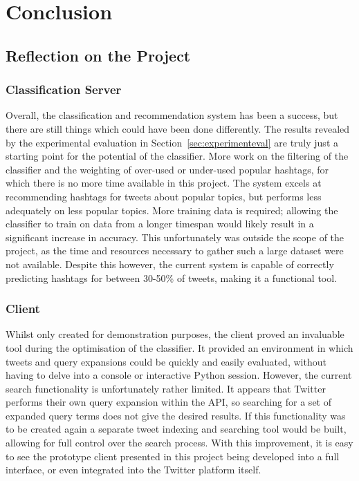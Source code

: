 \documentclass[11pt,a4paper]{report}
\begin{document}
\pagebreak

\chapter{Conclusion}
\label{chap:conclusion}

\section{Reflection on the Project}
\label{sec:reflection}
\subsection{Classification Server}
Overall, the classification and recommendation system has been a success, but there are still things which could have been done differently. The results revealed by the experimental evaluation in Section~\ref{sec:experimenteval} are truly just a starting point for the potential of the classifier. More work on the filtering of the classifier and the weighting of over-used or under-used popular hashtags, for which there is no more time available in this project. The system excels at recommending hashtags for tweets about popular topics, but performs less adequately on less popular topics. More training data is required; allowing the classifier to train on data from a longer timespan would likely result in a significant increase in accuracy. This unfortunately was outside the scope of the project, as the time and resources necessary to gather such a large dataset were not available. Despite this however, the current system is capable of correctly predicting hashtags for between 30-50\% of tweets, making it a functional tool.

\subsection{Client}
Whilst only created for demonstration purposes, the client proved an invaluable tool during the optimisation of the classifier. It provided an environment in which tweets and query expansions could be quickly and easily evaluated, without having to delve into a console or interactive Python session. However, the current search functionality is unfortunately rather limited. It appears that Twitter performs their own query expansion within the API, so searching for a set of expanded query terms does not give the desired results. If this functionality was to be created again a separate tweet indexing and searching tool would be built, allowing for full control over the search process. With this improvement, it is easy to see the prototype client presented in this project being developed into a full interface, or even integrated into the Twitter platform itself.
\end{document}
